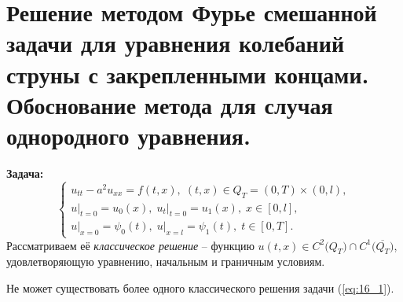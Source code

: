 \documentclass[../main.tex]{subfiles}
\begin{document}
\section{Решение методом Фурье смешанной задачи для уравнения колебаний струны с закрепленными концами. Обоснование метода для случая однородного уравнения.}
\textbf{Задача:}
\begin{equation}
\label{eq:16_1}
\begin{cases}
	u_{tt} - a^2u_{xx} = f(t, x),\; (t, x) \in Q_{T} = (0, T) \times (0, l), \\
    u\bigr|_{t = 0} = u_{0}(x), \; u_{t}\bigr|_{t =0} = u_{1}(x),\; x \in [0, l], \\
    u\bigr|_{x = 0} = \psi_{0}(t), \; u\bigr|_{x = l} = \psi_{1}(t), \; t \in [0, T].
\end{cases}
\end{equation}
Рассматриваем её \textit{классическое решение} -- функцию $u(t, x) \in C^{2}\bigl(Q_{T}\bigr) \cap C^{1}\bigl(\overline{Q_T}\bigr)$, удовлетворяющую уравнению, начальным и граничным условиям. \\
\begin{theorem}[Единственности]
Не может существовать более одного классического решения задачи (\ref{eq:16_1}).
\end{theorem}
\end{document}
